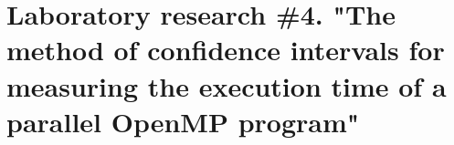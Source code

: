 { %
	\section{Laboratory research \#4. "The method of confidence intervals for measuring the execution time of a parallel OpenMP program"{}}
	
	
	
}
